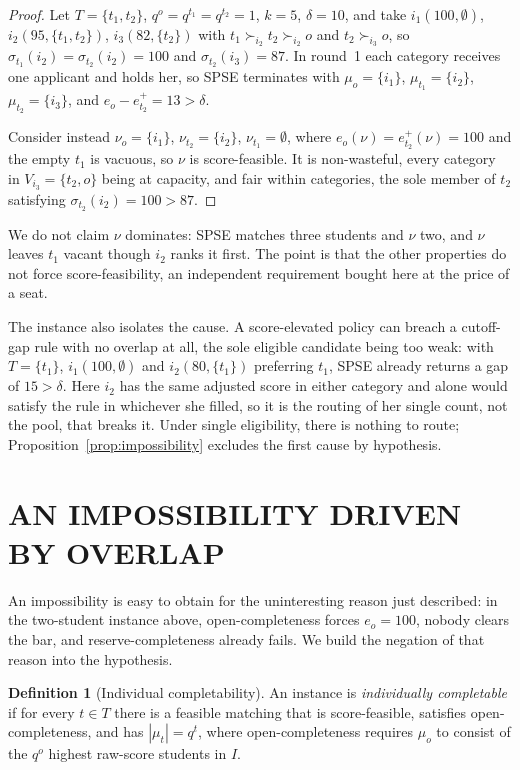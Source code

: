 \documentclass[a4paper,twoside]{article}
\theoremstyle{definition}
\newtheorem{definition}{Definition}
\begin{document}
\begin{proof}
Let $T=\{t_1,t_2\}$, $q^o=q^{t_1}=q^{t_2}=1$, $k=5$, $\delta=10$, and take $i_1(100,\emptyset)$, $i_2(95,\{t_1,t_2\})$, $i_3(82,\{t_2\})$ with $t_1\succ_{i_2}t_2\succ_{i_2}o$ and $t_2\succ_{i_3}o$, so $\sigma_{t_1}(i_2)=\sigma_{t_2}(i_2)=100$ and $\sigma_{t_2}(i_3)=87$. In round~1 each category receives one applicant and holds her, so SPSE terminates with $\mu_o=\{i_1\}$, $\mu_{t_1}=\{i_2\}$, $\mu_{t_2}=\{i_3\}$, and $e_o-e_{t_2}^+=13>\delta$.

Consider instead $\nu_o=\{i_1\}$, $\nu_{t_2}=\{i_2\}$, $\nu_{t_1}=\emptyset$, where $e_o(\nu)=e_{t_2}^+(\nu)=100$ and the empty $t_1$ is vacuous, so $\nu$ is score-feasible. It is non-wasteful, every category in $V_{i_3}=\{t_2,o\}$ being at capacity, and fair within categories, the sole member of $t_2$ satisfying $\sigma_{t_2}(i_2)=100>87$.
\end{proof}

We do not claim $\nu$ dominates: SPSE matches three students and $\nu$ two, and $\nu$ leaves $t_1$ vacant though $i_2$ ranks it first. The point is that the other properties do not force score-feasibility, an independent requirement bought here at the price of a seat.

The instance also isolates the cause. A score-elevated policy can breach a cutoff-gap rule with no overlap at all, the sole eligible candidate being too weak: with $T=\{t_1\}$, $i_1(100,\emptyset)$ and $i_2(80,\{t_1\})$ preferring $t_1$, SPSE already returns a gap of $15>\delta$. Here $i_2$ has the same adjusted score in either category and alone would satisfy the rule in whichever she filled, so it is the routing of her single count, not the pool, that breaks it. Under single eligibility, there is nothing to route; Proposition~\ref{prop:impossibility} excludes the first cause by hypothesis.

\section{\uppercase{An Impossibility Driven by Overlap}}
\label{sec:impossibility}

An impossibility is easy to obtain for the uninteresting reason just described: in the two-student instance above, open-completeness forces $e_o=100$, nobody clears the bar, and reserve-completeness already fails. We build the negation of that reason into the hypothesis.

\begin{definition}[Individual completability]
\label{def:indcomp}
An instance is \emph{individually completable} if for every $t\in T$ there is a feasible matching that is score-feasible, satisfies open-completeness, and has $|\mu_t|=q^t$, where open-completeness requires $\mu_o$ to consist of the $q^o$ highest raw-score students in $I$.
\end{definition}
\end{document}
